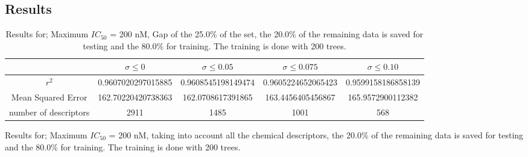 \documentclass[12pt,letterpaper]{article}
\begin{document}
\newpage
\begin{landscape}
\section{Results}
\begin{table}[H]
\centering
\caption{Results for; Maximum $IC_{50}$ = 200 nM, Gap of the 25.0\% of the set, the 20.0\% of the remaining data is saved for testing and the  80.0\% for training. The training is done with 200 trees.}
\label{tableCorrelationFactorVariation}
\begin{tabular}{c||c|c|c|c}
          &$\sigma\leq0$ & $\sigma\leq0.05$ & $\sigma\leq0.075$  & $\sigma\leq0.10$ \\\hline\hline
$r^2$ & 0.9607020297015885 & 0.9608545198149474 & 0.9605224652065423 & 0.9599158186858139 \\\hline
Mean Squared Error & 162.70220420738363 & 162.0708617391865 & 163.4456405456867 & 165.9572900112382 \\\hline
number of descriptors & 2911 & 1485 & 1001 & 568
\end{tabular}
\end{table}

\begin{table}[H]
\centering
\caption{Results for; Maximum $IC_{50}$ = 200 nM,  taking into account all the chemical descriptors, the 20.0\% of the remaining data is saved for testing and the  80.0\% for training. The training is done with 200 trees.}


\end{table}
\end{landscape}
\end{document}
